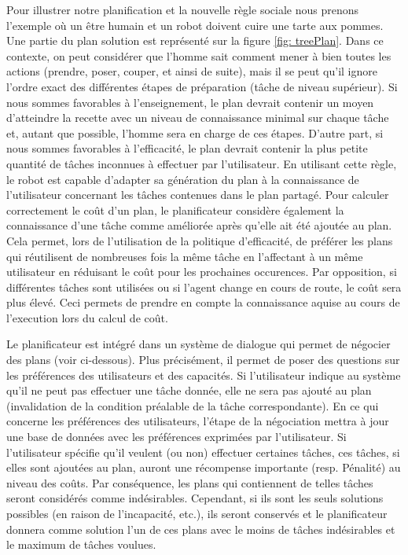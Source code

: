 \documentclass[a4paper,11pt,twoside]{StyleThese}
\begin{document}
Pour illustrer notre planification et la nouvelle règle sociale nous prenons l'exemple où un être humain et un robot doivent cuire une tarte aux pommes. Une partie du plan solution est représenté sur la figure \ref{fig: treePlan}. Dans ce contexte, on peut considérer que l'homme sait comment mener à bien toutes les actions (prendre, poser, couper, et ainsi de suite), mais il se peut qu'il ignore  l'ordre exact des différentes étapes de préparation (tâche de niveau supérieur). Si nous sommes favorables à l'enseignement, le plan devrait contenir un moyen d'atteindre la recette avec un niveau de connaissance minimal sur chaque tâche et, autant que possible, l'homme sera en charge de ces étapes. D'autre part, si nous sommes favorables à l'efficacité, le plan devrait contenir la plus petite quantité de tâches inconnues à effectuer par l'utilisateur.
En utilisant cette règle, le robot est capable d'adapter sa génération du plan à la connaissance de l'utilisateur concernant les tâches contenues dans le plan partagé.
Pour calculer correctement le coût d'un plan, le planificateur considère également la connaissance d'une tâche comme améliorée après qu'elle ait été ajoutée au plan. Cela permet, lors de l'utilisation de la politique d'efficacité, de préférer les plans qui réutilisent de nombreuses fois la même tâche en l'affectant à un même utilisateur en réduisant le coût pour les prochaines occurences. Par opposition, si différentes tâches sont utilisées ou si l'agent change en cours de route, le coût sera plus élevé. Ceci permets de prendre en compte la connaissance aquise au cours de l'execution lors du calcul de coût.

Le planificateur est intégré dans un système de dialogue qui permet de négocier des plans (voir ci-dessous). Plus précisément, il permet de poser des questions sur les préférences des utilisateurs et des capacités. Si l'utilisateur indique au système qu'il ne peut pas effectuer une tâche donnée, elle ne sera pas ajouté au plan (invalidation de la condition préalable de la tâche correspondante).
En ce qui concerne les préférences des utilisateurs, l'étape de la négociation mettra à jour une base de données avec les préférences exprimées par l'utilisateur. Si l'utilisateur spécifie qu'il veulent (ou non) effectuer certaines tâches, ces tâches, si elles sont ajoutées au plan, auront une récompense importante (resp. Pénalité) au niveau des coûts. Par conséquence, les plans qui contiennent de telles tâches seront considérés comme indésirables. Cependant, si ils sont les seuls solutions possibles (en raison de l'incapacité, etc.), ils seront conservés et le planificateur donnera comme solution l'un de ces plans avec le moins de tâches indésirables et le maximum  de tâches voulues.
\end{document}
